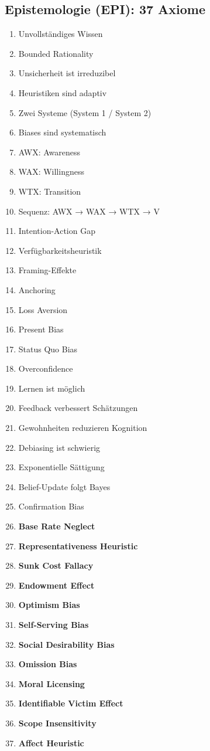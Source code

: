 \documentclass[11pt,a4paper]{article}
\theoremstyle{definition}
\theoremstyle{plain}
\begin{document}
\subsection{Epistemologie (EPI): 37 Axiome}
\begin{enumerate}[label=MA-EPI-\arabic*:, leftmargin=3cm]
    \item Unvollständiges Wissen
    \item Bounded Rationality
    \item Unsicherheit ist irreduzibel
    \item Heuristiken sind adaptiv
    \item Zwei Systeme (System 1 / System 2)
    \item Biases sind systematisch
    \item AWX: Awareness
    \item WAX: Willingness
    \item WTX: Transition
    \item Sequenz: AWX → WAX → WTX → V
    \item Intention-Action Gap
    \item Verfügbarkeitsheuristik
    \item Framing-Effekte
    \item Anchoring
    \item Loss Aversion
    \item Present Bias
    \item Status Quo Bias
    \item Overconfidence
    \item Lernen ist möglich
    \item Feedback verbessert Schätzungen
    \item Gewohnheiten reduzieren Kognition
    \item Debiasing ist schwierig
    \item Exponentielle Sättigung
    \item Belief-Update folgt Bayes
    \item Confirmation Bias
    \item \textbf{Base Rate Neglect}
    \item \textbf{Representativeness Heuristic}
    \item \textbf{Sunk Cost Fallacy}
    \item \textbf{Endowment Effect}
    \item \textbf{Optimism Bias}
    \item \textbf{Self-Serving Bias}
    \item \textbf{Social Desirability Bias}
    \item \textbf{Omission Bias}
    \item \textbf{Moral Licensing}
    \item \textbf{Identifiable Victim Effect}
    \item \textbf{Scope Insensitivity}
    \item \textbf{Affect Heuristic}
\end{enumerate}
\end{document}
